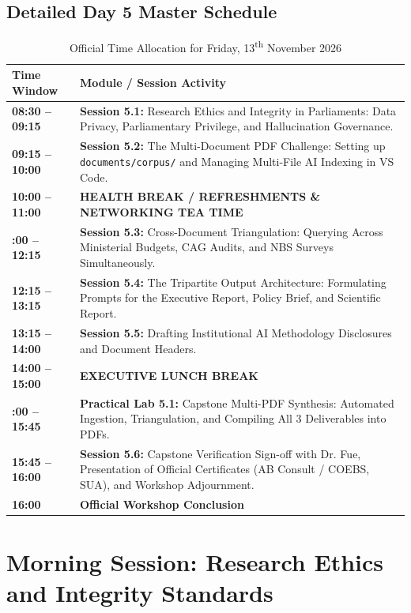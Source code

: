 \documentclass[11pt, a4paper]{report}
\begin{document}
\section{Detailed Day 5 Master Schedule}
\begin{table}[htbp]
\centering
\caption{Official Time Allocation for Friday, 13\textsuperscript{th} November 2026}
\vspace{0.2cm}
\begin{tabular}{@{}>{\bfseries}lp{11.5cm}@{}}
\toprule
Time Window & Module / Session Activity \\
\midrule
08:30 -- 09:15 & \textbf{Session 5.1:} Research Ethics and Integrity in Parliaments: Data Privacy, Parliamentary Privilege, and Hallucination Governance. \\
09:15 -- 10:00 & \textbf{Session 5.2:} The Multi-Document PDF Challenge: Setting up \texttt{documents/corpus/} and Managing Multi-File AI Indexing in VS Code. \\
\addlinespace
\textbf{10:00 -- 11:00} & \textbf{HEALTH BREAK / REFRESHMENTS \& NETWORKING TEA TIME} \\
\addlinespace
11:00 -- 12:15 & \textbf{Session 5.3:} Cross-Document Triangulation: Querying Across Ministerial Budgets, CAG Audits, and NBS Surveys Simultaneously. \\
12:15 -- 13:15 & \textbf{Session 5.4:} The Tripartite Output Architecture: Formulating Prompts for the Executive Report, Policy Brief, and Scientific Report. \\
13:15 -- 14:00 & \textbf{Session 5.5:} Drafting Institutional AI Methodology Disclosures and Document Headers. \\
\addlinespace
\textbf{14:00 -- 15:00} & \textbf{EXECUTIVE LUNCH BREAK} \\
\addlinespace
15:00 -- 15:45 & \textbf{Practical Lab 5.1:} Capstone Multi-PDF Synthesis: Automated Ingestion, Triangulation, and Compiling All 3 Deliverables into PDFs. \\
15:45 -- 16:00 & \textbf{Session 5.6:} Capstone Verification Sign-off with Dr. Fue, Presentation of Official Certificates (AB Consult / COEBS, SUA), and Workshop Adjournment. \\
\textbf{16:00} & \textbf{Official Workshop Conclusion} \\
\bottomrule
\end{tabular}
\end{table}

\newpage

\chapter{Morning Session: Research Ethics and Integrity Standards}
\end{document}

